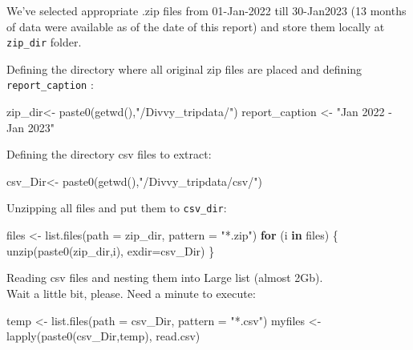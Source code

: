 \documentclass[
]{article}
\newenvironment{Shaded}{\begin{snugshade}}{\end{snugshade}}
\newcommand{\AttributeTok}[1]{\textcolor[rgb]{0.77,0.63,0.00}{#1}}
\newcommand{\ControlFlowTok}[1]{\textcolor[rgb]{0.13,0.29,0.53}{\textbf{#1}}}
\newcommand{\FunctionTok}[1]{\textcolor[rgb]{0.00,0.00,0.00}{#1}}
\newcommand{\NormalTok}[1]{#1}
\newcommand{\OtherTok}[1]{\textcolor[rgb]{0.56,0.35,0.01}{#1}}
\newcommand{\StringTok}[1]{\textcolor[rgb]{0.31,0.60,0.02}{#1}}
\begin{document}
We've selected appropriate .zip files from 01-Jan-2022 till 30-Jan2023
(13 months of data were available as of the date of this report) and
store them locally at \texttt{zip\_dir} folder.

Defining the directory where all original zip files are placed and
defining \texttt{report\_caption} :

\begin{Shaded}
\begin{Highlighting}[]
\NormalTok{zip\_dir}\OtherTok{\textless{}{-}} \FunctionTok{paste0}\NormalTok{(}\FunctionTok{getwd}\NormalTok{(),}\StringTok{"/Divvy\_tripdata/"}\NormalTok{) }
\NormalTok{report\_caption }\OtherTok{\textless{}{-}} \StringTok{"Jan 2022 {-} Jan 2023"}
\end{Highlighting}
\end{Shaded}

Defining the directory csv files to extract:

\begin{Shaded}
\begin{Highlighting}[]
\NormalTok{csv\_Dir}\OtherTok{\textless{}{-}} \FunctionTok{paste0}\NormalTok{(}\FunctionTok{getwd}\NormalTok{(),}\StringTok{"/Divvy\_tripdata/csv/"}\NormalTok{) }
\end{Highlighting}
\end{Shaded}

Unzipping all files and put them to \texttt{csv\_dir}:

\begin{Shaded}
\begin{Highlighting}[]
\NormalTok{files }\OtherTok{\textless{}{-}} \FunctionTok{list.files}\NormalTok{(}\AttributeTok{path =}\NormalTok{ zip\_dir, }\AttributeTok{pattern =} \StringTok{"*.zip"}\NormalTok{)}
\ControlFlowTok{for}\NormalTok{ (i }\ControlFlowTok{in}\NormalTok{ files) \{}
  \FunctionTok{unzip}\NormalTok{(}\FunctionTok{paste0}\NormalTok{(zip\_dir,i), }\AttributeTok{exdir=}\NormalTok{csv\_Dir)}
\NormalTok{\}}
\end{Highlighting}
\end{Shaded}

Reading csv files and nesting them into Large list (almost 2Gb).\\

Wait a little bit, please. Need a minute to execute:

\begin{Shaded}
\begin{Highlighting}[]
\NormalTok{temp }\OtherTok{\textless{}{-}} \FunctionTok{list.files}\NormalTok{(}\AttributeTok{path =}\NormalTok{ csv\_Dir, }\AttributeTok{pattern =} \StringTok{"*.csv"}\NormalTok{)}
\NormalTok{myfiles }\OtherTok{\textless{}{-}} \FunctionTok{lapply}\NormalTok{(}\FunctionTok{paste0}\NormalTok{(csv\_Dir,temp), read.csv)}
\end{Highlighting}
\end{Shaded}
\end{document}
